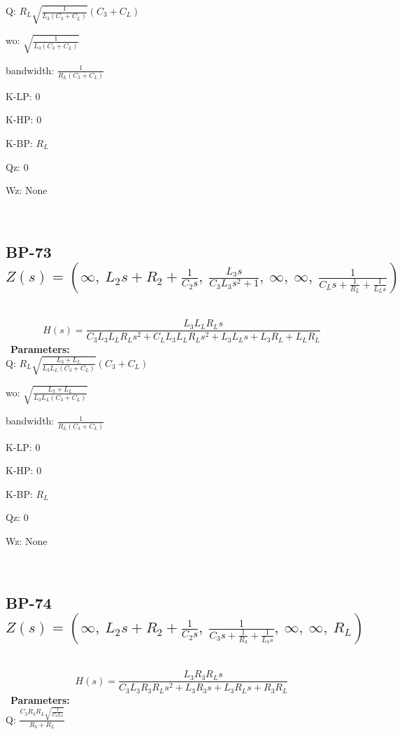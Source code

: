 \documentclass{article}
\begin{document}
Q: $R_{L} \sqrt{\frac{1}{L_{3} \left(C_{3} + C_{L}\right)}} \left(C_{3} + C_{L}\right)$\ 

wo: $\sqrt{\frac{1}{L_{3} \left(C_{3} + C_{L}\right)}}$\ 

bandwidth: $\frac{1}{R_{L} \left(C_{3} + C_{L}\right)}$\ 

K-LP: $0$\ 

K-HP: $0$\ 

K-BP: $R_{L}$\ 

Qz: $0$\ 

Wz: $\text{None}$\ 

\ 

\subsection{BP-73 $Z(s) = \left( \infty, \  L_{2} s + R_{2} + \frac{1}{C_{2} s}, \  \frac{L_{3} s}{C_{3} L_{3} s^{2} + 1}, \  \infty, \  \infty, \  \frac{1}{C_{L} s + \frac{1}{R_{L}} + \frac{1}{L_{L} s}}\right)$ } \ 
\textbf{\[H(s) = \frac{L_{3} L_{L} R_{L} s}{C_{3} L_{3} L_{L} R_{L} s^{2} + C_{L} L_{3} L_{L} R_{L} s^{2} + L_{3} L_{L} s + L_{3} R_{L} + L_{L} R_{L}}\] } \ 
\textbf{Parameters:}\\ 

Q: $R_{L} \sqrt{\frac{L_{3} + L_{L}}{L_{3} L_{L} \left(C_{3} + C_{L}\right)}} \left(C_{3} + C_{L}\right)$\ 

wo: $\sqrt{\frac{L_{3} + L_{L}}{L_{3} L_{L} \left(C_{3} + C_{L}\right)}}$\ 

bandwidth: $\frac{1}{R_{L} \left(C_{3} + C_{L}\right)}$\ 

K-LP: $0$\ 

K-HP: $0$\ 

K-BP: $R_{L}$\ 

Qz: $0$\ 

Wz: $\text{None}$\ 

\ 

\subsection{BP-74 $Z(s) = \left( \infty, \  L_{2} s + R_{2} + \frac{1}{C_{2} s}, \  \frac{1}{C_{3} s + \frac{1}{R_{3}} + \frac{1}{L_{3} s}}, \  \infty, \  \infty, \  R_{L}\right)$ } \ 
\textbf{\[H(s) = \frac{L_{3} R_{3} R_{L} s}{C_{3} L_{3} R_{3} R_{L} s^{2} + L_{3} R_{3} s + L_{3} R_{L} s + R_{3} R_{L}}\] } \ 
\textbf{Parameters:}\\ 

Q: $\frac{C_{3} R_{3} R_{L} \sqrt{\frac{1}{C_{3} L_{3}}}}{R_{3} + R_{L}}$\ 
\end{document}
